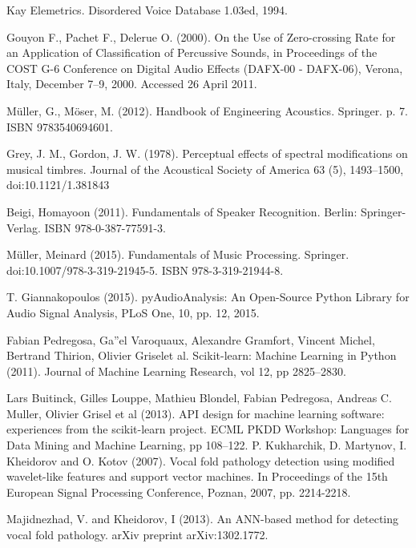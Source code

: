 \documentclass[conference]{IEEEtran}
\begin{document}
\begin{thebibliography}{00}
Kay Elemetrics. Disordered Voice Database 1.03ed, 1994.	

 Gouyon F., Pachet F., Delerue O. (2000). On the Use of Zero-crossing Rate for an Application of Classification of Percussive Sounds, in Proceedings of the COST G-6 Conference on Digital Audio Effects (DAFX-00 - DAFX-06), Verona, Italy, December 7–9, 2000. Accessed 26 April 2011.

Müller, G., Möser, M. (2012). Handbook of Engineering Acoustics. Springer. p. 7. ISBN 9783540694601.

Grey, J. M., Gordon, J. W. (1978). Perceptual effects of spectral modifications on musical timbres. Journal of the Acoustical Society of America 63 (5), 1493–1500, doi:10.1121/1.381843

Beigi, Homayoon (2011). Fundamentals of Speaker Recognition. Berlin: Springer-Verlag. ISBN 978-0-387-77591-3.

Müller, Meinard (2015). Fundamentals of Music Processing. Springer. doi:10.1007/978-3-319-21945-5. ISBN 978-3-319-21944-8.

T. Giannakopoulos (2015). pyAudioAnalysis: An Open-Source Python Library for Audio Signal Analysis, PLoS One, 10, pp. 12, 2015.

Fabian Pedregosa, Ga''el Varoquaux, Alexandre Gramfort, Vincent Michel, Bertrand Thirion, Olivier Griselet al. Scikit-learn: Machine Learning in Python (2011). Journal of Machine Learning Research, vol 12, pp 2825--2830.

Lars Buitinck, Gilles Louppe, Mathieu Blondel, Fabian Pedregosa, Andreas C. Muller, Olivier Grisel et al (2013). API design for machine learning software: experiences from the scikit-learn project. ECML PKDD Workshop: Languages for Data Mining and Machine Learning, pp 108--122.
P. Kukharchik, D. Martynov, I. Kheidorov and O. Kotov (2007). Vocal fold pathology detection using modified wavelet-like features and support vector machines. In Proceedings of the 15th European Signal Processing Conference, Poznan, 2007, pp. 2214-2218.

Majidnezhad, V. and Kheidorov, I (2013). An ANN-based method for detecting vocal fold pathology. arXiv preprint arXiv:1302.1772.


\end{thebibliography}
\end{document}
